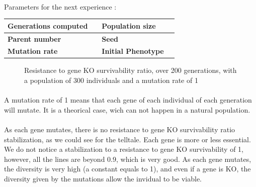 \documentclass[]{report} %
\makeatletter
\newcommand{\simulationParameters}[1]{%
        \setkeys[SIMPAR]{fam}{#1}
        \begin{tabular}{|l|c||l|c|}
        \hline
        \textbf{Generations computed} & \cmdSIMPAR@fam@generations & \textbf{Population size}     & \cmdSIMPAR@fam@popsize \\ \hline
        \textbf{Parent number}        & \cmdSIMPAR@fam@parents     & \textbf{Seed}                & \cmdSIMPAR@fam@seed    \\ \hline
        \textbf{Mutation rate}        & \cmdSIMPAR@fam@mutationrate& \textbf{Initial Phenotype}   & \cmdSIMPAR@fam@initialpheno \\ \hline
        \end{tabular}
}
\makeatother
\begin{document}
    \paragraph*{}
    Parameters for the next experience :\\
    \simulationParameters{Mutation rate}
    \begin{figure}[H] 
      \centering
      \caption{\footnotesize Resistance to gene KO survivability ratio, over 200 generations, with a population of 300 individuals and a mutation rate of 1}
      \label{fig:ps300xg200xmr1-10-0}
    \end{figure}
    \paragraph*{}
    A mutation rate of 1 means that each gene of each individual of each generation will mutate. It is a theorical case, wich can not happen in a natural population.
    \paragraph*{}
    As each gene mutates, there is no resistance to gene KO survivability ratio stabilization, as we could see for the telltale. Each gene is more or less essential. We do not notice a stabilization to a resistance to gene KO survivability of 1, however, all the lines are beyond 0.9, which is very good. As each gene mutates, the diversity is very high (a constant equals to 1), and even if a gene is KO, the diversity given by the mutations allow the invidual to be viable.
\end{document}
